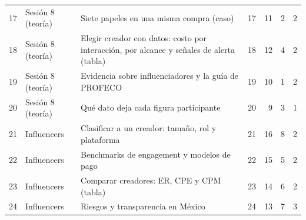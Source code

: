 \documentclass[10pt,letterpaper]{article}
\begin{document}
\begin{center}
\begin{longtable}{@{}rllrrrc@{}}
17 & Sesión 8 (teoría) & Siete papeles en una misma compra (caso) & 17 & 11 & 2 & 2\\
18 & Sesión 8 (teoría) & Elegir creador con datos: costo por interacción, por alcance y señales de alerta (tabla) & 18 & 12 & 4 & 2\\
19 & Sesión 8 (teoría) & Evidencia sobre influenciadores y la guía de PROFECO & 19 & 10 & 1 & 2\\
20 & Sesión 8 (teoría) & Qué dato deja cada figura participante & 20 & 9 & 3 & 1\\
21 & Influencers & Clasificar a un creador: tamaño, rol y plataforma & 21 & 16 & 8 & 2\\
22 & Influencers & Benchmarks de engagement y modelos de pago & 22 & 15 & 5 & 2\\
23 & Influencers & Comparar creadores: ER, CPE y CPM (tabla) & 23 & 14 & 6 & 2\\
24 & Influencers & Riesgos y transparencia en México & 24 & 13 & 7 & 3\\
\bottomrule\end{longtable}\end{center}
\end{document}

